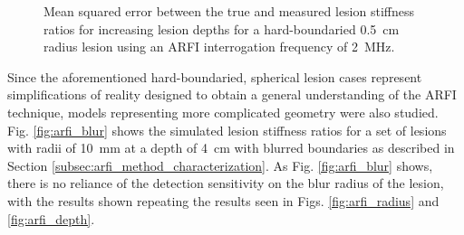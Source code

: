 			\begin{figure}[!htb]
				\centering
				\caption[ARFI imaging-acquired lesion stiffness mean squared error related to lesion depth]{Mean squared error between the true and measured lesion stiffness ratios for increasing lesion depths for a hard-boundaried \SI{0.5}{cm} radius lesion using an ARFI interrogation frequency of \SI{2}{\MHz}.}
				\label{fig:arfi_depth_mse}
			\end{figure}

			Since the aforementioned hard-boundaried, spherical lesion cases represent simplifications of reality designed to obtain a general understanding of the ARFI technique, models representing more complicated geometry were also studied. Fig. \ref{fig:arfi_blur} shows the simulated lesion stiffness ratios for a set of lesions with radii of \SI{10}{\mm} at a depth of \SI{4}{\cm} with blurred boundaries as described in Section \ref{subsec:arfi_method_characterization}. As Fig. \ref{fig:arfi_blur} shows, there is no reliance of the detection sensitivity on the blur radius of the lesion, with the results shown repeating the results seen in Figs. \ref{fig:arfi_radius} and \ref{fig:arfi_depth}.

